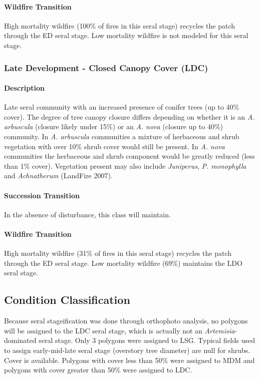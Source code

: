 \paragraph{Wildfire Transition} High mortality wildfire (100\% of fires in this seral stage) recycles the patch through the ED seral stage. Low mortality wildfire is not modeled for this seral stage.

\noindent\hrulefill


\subsubsection{Late Development - Closed Canopy Cover (LDC)} 

\paragraph{Description} Late seral community with an increased presence of conifer trees (up to 40\% cover). The degree of tree canopy closure differs depending on whether it is an \emph{A. arbuscula} (closure likely under 15\%) or an \emph{A. nova} (closure up to 40\%) community. In \emph{A. arbuscula} communities a mixture of herbaceous and shrub vegetation with over 10\% shrub cover would still be present. In \emph{A. nova} communities the herbaceous and shrub component would be greatly reduced (less than 1\% cover). Vegetation present may also include \emph{Juniperus}, \emph{P. monophylla} and \emph{Achnatherum} (LandFire 2007).

\paragraph{Succession Transition} In the absence of disturbance, this class will maintain. 

\paragraph{Wildfire Transition} High mortality wildfire (31\% of fires in this seral stage) recycles the patch through the ED seral stage. Low mortality wildfire (69\%) maintains the LDO seral stage.

\noindent\hrulefill

\subsection*{Condition Classification}
Because seral stageification was done through orthophoto analysis, no polygons will be assigned to the LDC seral stage, which is actually not an \emph{Artemisia}-dominated seral stage. Only 3 polygons were assigned to LSG. Typical fields used to assign early-mid-late seral stage (overstory tree diameter) are null for shrubs. Cover is available. Polygons with cover less than 50\% were assigned to MDM and polygons with cover greater than 50\% were assigned to LDC.

